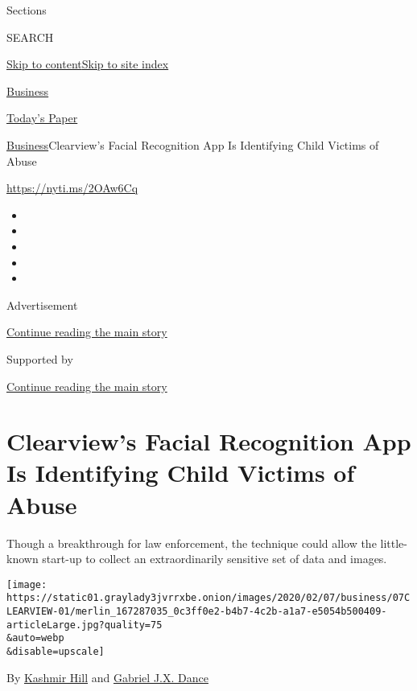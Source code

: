 Sections

SEARCH

\protect\hyperlink{site-content}{Skip to
content}\protect\hyperlink{site-index}{Skip to site index}

\href{https://www.nytimes3xbfgragh.onion/section/business}{Business}

\href{https://myaccount.nytimes3xbfgragh.onion/auth/login?response_type=cookie\&client_id=vi}{}

\href{https://www.nytimes3xbfgragh.onion/section/todayspaper}{Today's
Paper}

\href{/section/business}{Business}\textbar{}Clearview's Facial
Recognition App Is Identifying Child Victims of Abuse

\href{https://nyti.ms/2OAw6Cq}{https://nyti.ms/2OAw6Cq}

\begin{itemize}
\item
\item
\item
\item
\item
\end{itemize}

Advertisement

\protect\hyperlink{after-top}{Continue reading the main story}

Supported by

\protect\hyperlink{after-sponsor}{Continue reading the main story}

\hypertarget{clearviews-facial-recognition-app-is-identifying-child-victims-of-abuse}{%
\section{Clearview's Facial Recognition App Is Identifying Child Victims
of
Abuse}\label{clearviews-facial-recognition-app-is-identifying-child-victims-of-abuse}}

Though a breakthrough for law enforcement, the technique could allow the
little-known start-up to collect an extraordinarily sensitive set of
data and images.

\texttt{[image: https://static01.graylady3jvrrxbe.onion/images/2020/02/07/business/07CLEARVIEW-01/merlin\_167287035\_0c3ff0e2-b4b7-4c2b-a1a7-e5054b500409-articleLarge.jpg?quality=75\\\&auto=webp\\\&disable=upscale]}

By \href{https://www.nytimes3xbfgragh.onion/by/kashmir-hill}{Kashmir
Hill} and
\href{https://www.nytimes3xbfgragh.onion/by/gabriel-dance}{Gabriel J.X.
Dance}

